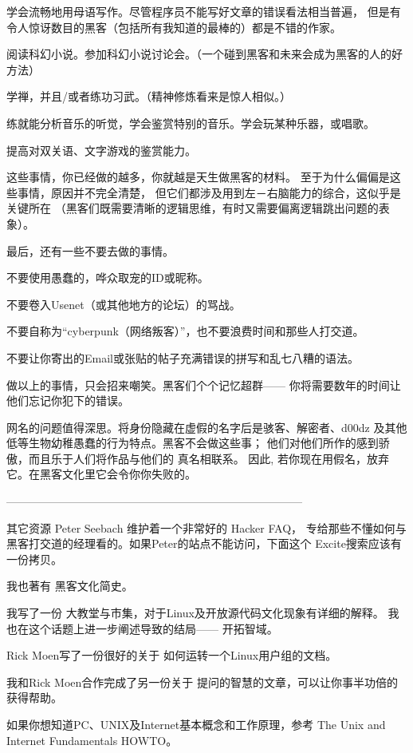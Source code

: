 \documentclass[a4paper,12pt,UTF8,twoside]{ctexbook}
\begin{document}
学会流畅地用母语写作。尽管程序员不能写好文章的错误看法相当普遍， 但是有令人惊讶数目的黑客（包括所有我知道的最棒的）都是不错的作家。

阅读科幻小说。参加科幻小说讨论会。（一个碰到黑客和未来会成为黑客的人的好方法）

学禅，并且/或者练功习武。（精神修炼看来是惊人相似。）

练就能分析音乐的听觉，学会鉴赏特别的音乐。学会玩某种乐器，或唱歌。

提高对双关语、文字游戏的鉴赏能力。

这些事情，你已经做的越多，你就越是天生做黑客的材料。 至于为什么偏偏是这些事情，原因并不完全清楚， 但它们都涉及用到左－右脑能力的综合，这似乎是关键所在 （黑客们既需要清晰的逻辑思维，有时又需要偏离逻辑跳出问题的表象）。

最后，还有一些不要去做的事情。


不要使用愚蠢的，哗众取宠的ID或昵称。

不要卷入Usenet（或其他地方的论坛）的骂战。

不要自称为“cyberpunk（网络叛客）”，也不要浪费时间和那些人打交道。

不要让你寄出的Email或张贴的帖子充满错误的拼写和乱七八糟的语法。

做以上的事情，只会招来嘲笑。黑客们个个记忆超群—— 你将需要数年的时间让他们忘记你犯下的错误。

网名的问题值得深思。将身份隐藏在虚假的名字后是骇客、解密者、d00dz 及其他低等生物幼稚愚蠢的行为特点。黑客不会做这些事； 他们对他们所作的感到骄傲，而且乐于人们将作品与他们的 真名相联系。 因此, 若你现在用假名，放弃它。在黑客文化里它会令你你失败的。


--------------------------------------------------------------------------------

其它资源
Peter Seebach 维护着一个非常好的 Hacker FAQ， 专给那些不懂如何与黑客打交道的经理看的。如果Peter的站点不能访问，下面这个 Excite搜索应该有一份拷贝。

我也著有 黑客文化简史。

我写了一份 大教堂与市集，对于Linux及开放源代码文化现象有详细的解释。 我也在这个话题上进一步阐述导致的结局—— 开拓智域。

Rick Moen写了一份很好的关于 如何运转一个Linux用户组的文档。

我和Rick Moen合作完成了另一份关于 提问的智慧的文章，可以让你事半功倍的获得帮助。

如果你想知道PC、UNIX及Internet基本概念和工作原理，参考 The Unix and Internet Fundamentals HOWTO。
\end{document}
